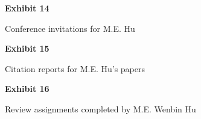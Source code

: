 \documentclass{article}
\begin{document}
% 


\vspace*{\fill}
\begin{center}

{\LARGE \bf
Exhibit 14
}

\vspace{10\baselineskip}

{\large Conference invitations for M.E. Hu}

\end{center}
\vspace*{\fill}

% 

% 

% 

% 

% 


\vspace*{\fill}
\begin{center}

{\LARGE \bf
Exhibit 15
}

\vspace{10\baselineskip}

{\large Citation reports for M.E. Hu’s papers}

\end{center}
\vspace*{\fill}

% 


\vspace*{\fill}
\begin{center}

{\LARGE \bf
Exhibit 16
}

\vspace{10\baselineskip}

{\large  Review assignments completed by M.E. Wenbin Hu}

\end{center}
\vspace*{\fill}
\end{document}
